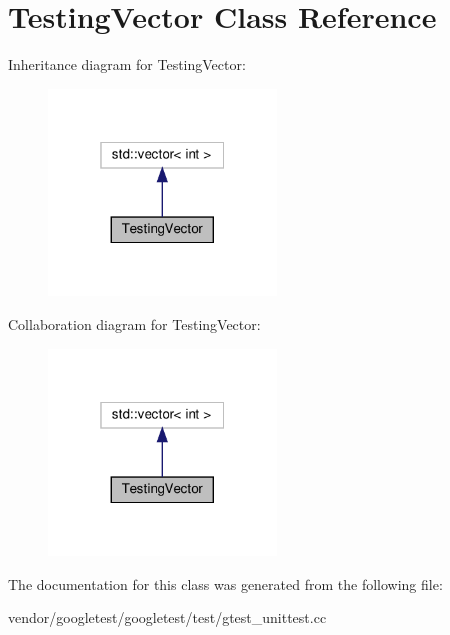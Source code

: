 \hypertarget{class_testing_vector}{}\section{Testing\+Vector Class Reference}
\label{class_testing_vector}


Inheritance diagram for Testing\+Vector\+:
\nopagebreak
\begin{figure}[H]
\begin{center}
\leavevmode
\includegraphics[width=172pt]{class_testing_vector__inherit__graph}
\end{center}
\end{figure}


Collaboration diagram for Testing\+Vector\+:
\nopagebreak
\begin{figure}[H]
\begin{center}
\leavevmode
\includegraphics[width=172pt]{class_testing_vector__coll__graph}
\end{center}
\end{figure}


The documentation for this class was generated from the following file\+:\begin{DoxyCompactItemize}
\item 
vendor/googletest/googletest/test/gtest\+\_\+unittest.\+cc\end{DoxyCompactItemize}
